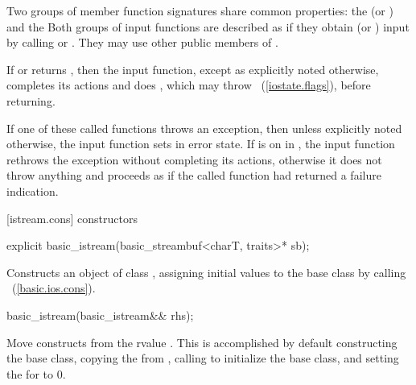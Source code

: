 \pnum
Two groups of member function signatures share common properties:
the
(or
)
and the
Both groups of input functions are described as if they obtain (or
)
input
by calling
or
.
They may use other public members of
.

\pnum
If
or
returns
,
then the input function, except as explicitly noted otherwise, completes its actions and does
,
which may throw
~(\ref{iostate.flags}), before returning.

\pnum
If one of these called functions throws an exception, then unless explicitly noted otherwise,
the input function sets
in error state.
If
is on in
,
the input function
rethrows the exception without completing its actions, otherwise
it does not throw anything and proceeds as if the called function had returned
a failure indication.

[istream.cons]{ constructors}

%
\begin{itemdecl}
explicit basic_istream(basic_streambuf<charT, traits>* sb);
\end{itemdecl}

%
\begin{itemdescr}
\pnum
\effects
Constructs an object of class
,
assigning initial values to the base class by calling
~(\ref{basic.ios.cons}).

\pnum
\postconditions
{}
\end{itemdescr}


%
\begin{itemdecl}
basic_istream(basic_istream&& rhs);
\end{itemdecl}

\begin{itemdescr}
\pnum
\effects Move constructs from the rvalue .
This is accomplished by default constructing the base class, copying the
 from , calling
 to initialize the base
class, and setting the  for  to 0.
\end{itemdescr}

